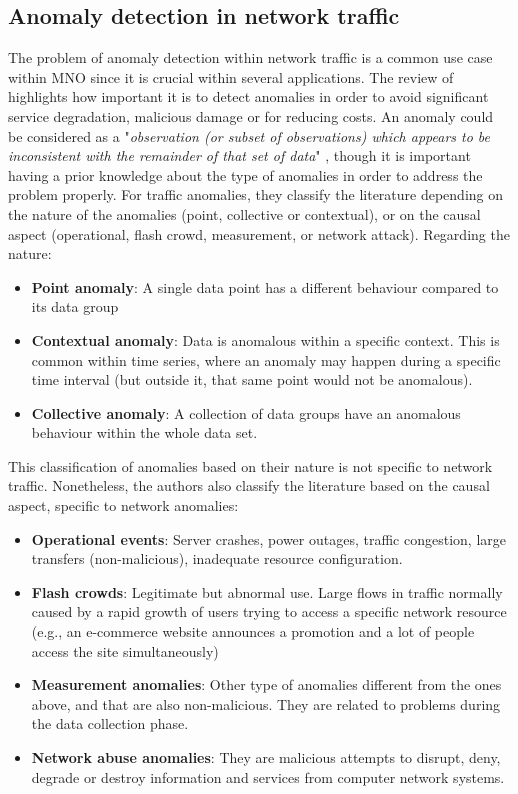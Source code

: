 \subsection{Anomaly detection in network traffic}\label{subsec:ch2-sota-comms}

The problem of anomaly detection within network traffic is a common use case within MNO since it is crucial within several applications. The review of \parencite{fernandes2019comprehensive} highlights how important it is to detect anomalies in order to avoid significant service degradation, malicious damage or for reducing costs. An anomaly could be considered as a "\textit{observation (or subset of observations) which appears to be inconsistent with the remainder of that set of data}" \parencite{barnett1984outliers}, though it is important having a prior knowledge about the type of anomalies in order to address the problem properly. For traffic anomalies, they classify the literature depending on the nature of the anomalies (point, collective or contextual), or on the causal aspect (operational, flash crowd, measurement,  or network attack). 
Regarding the nature:
\begin{itemize}
\item \textbf{Point anomaly}: A single data point has a different behaviour compared to its data group
\item \textbf{Contextual anomaly}: Data is anomalous within a specific context. This is common within time series, where an anomaly may happen during a specific time interval (but outside it, that same point would not be anomalous).
\item \textbf{Collective anomaly}: A collection of data groups have an anomalous behaviour within the whole data set.
\end{itemize}

This classification of anomalies based on their nature is not specific to network traffic. Nonetheless, the authors also classify the literature based on the causal aspect, specific to network anomalies:
\begin{itemize}
\item \textbf{Operational events}: Server crashes, power outages, traffic congestion, large transfers (non-malicious), inadequate resource configuration.
\item \textbf{Flash crowds}: Legitimate but abnormal use. Large flows in traffic normally caused by a rapid growth of users trying to access a specific network resource (e.g., an e-commerce website announces a promotion and a lot of people access the site simultaneously)
\item \textbf{Measurement anomalies}: Other type of anomalies different from the ones above, and that are also non-malicious. They are related to problems during the data collection phase.
\item \textbf{Network abuse anomalies}: They are malicious attempts to disrupt, deny, degrade or destroy information and services from computer network systems.
\end{itemize}


